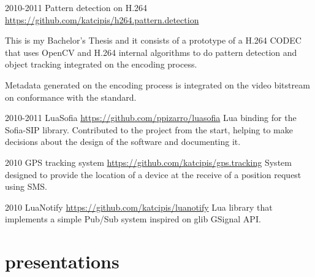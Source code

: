 \documentclass[]{friggeri-cv} %
\begin{document}
\begin{entrylist}
\entry
{2010-2011}
{Pattern detection on H.264}
{\href{https://github.com/katcipis/h264.pattern.detection}{https://github.com/katcipis/h264.pattern.detection}}
{
This is my Bachelor's Thesis and it consists of a prototype
of a H.264 CODEC that uses OpenCV and H.264 internal
algorithms to do pattern detection and
object tracking integrated on the encoding process.

Metadata generated on the encoding process is integrated on
the video bitstream on conformance with the standard.
}
\end{entrylist}


\begin{entrylist}
\entry
{2010-2011}
{LuaSofia}
{\href{https://github.com/ppizarro/luasofia}{https://github.com/ppizarro/luasofia}}
{
Lua binding for the Sofia-SIP library.
Contributed to the project from the start,
helping to make decisions about the design of the
software and documenting it.
}
\end{entrylist}

\begin{entrylist}
\entry
{2010}
{GPS tracking system}
{\href{https://github.com/katcipis/gps.tracking}{https://github.com/katcipis/gps.tracking}}
{
System designed to provide the location of a device
at the receive of a position request using SMS.
}
\end{entrylist}

\begin{entrylist}
\entry
{2010}
{LuaNotify}
{\href{https://github.com/katcipis/luanotify}{https://github.com/katcipis/luanotify}}
{
Lua library that implements a simple Pub/Sub system
inspired on glib GSignal API.
}
\end{entrylist}
\pagebreak

\section{presentations}
\end{document}
